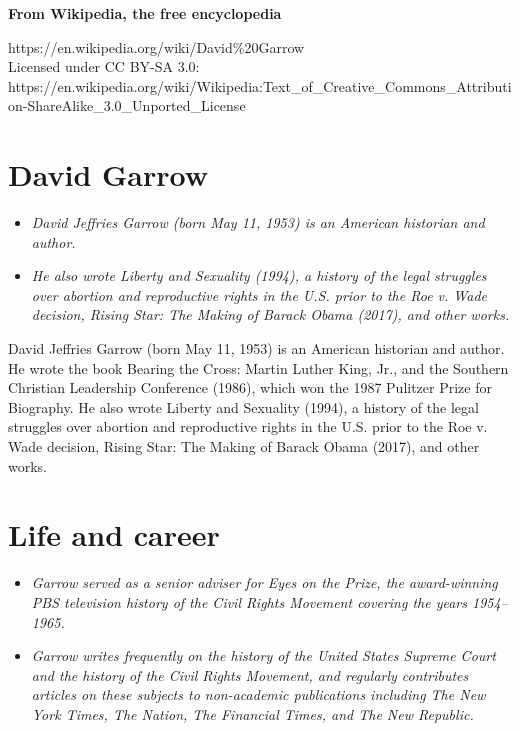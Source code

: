 \textbf{From Wikipedia, the free encyclopedia}

https://en.wikipedia.org/wiki/David\%20Garrow\\
Licensed under CC BY-SA 3.0:\\
https://en.wikipedia.org/wiki/Wikipedia:Text\_of\_Creative\_Commons\_Attribution-ShareAlike\_3.0\_Unported\_License

\section{David Garrow}\label{david-garrow}

\begin{itemize}
\item
  \emph{David Jeffries Garrow (born May 11, 1953) is an American
  historian and author.}
\item
  \emph{He also wrote Liberty and Sexuality (1994), a history of the
  legal struggles over abortion and reproductive rights in the U.S.
  prior to the Roe v. Wade decision, Rising Star: The Making of Barack
  Obama (2017), and other works.}
\end{itemize}

David Jeffries Garrow (born May 11, 1953) is an American historian and
author. He wrote the book Bearing the Cross: Martin Luther King, Jr.,
and the Southern Christian Leadership Conference (1986), which won the
1987 Pulitzer Prize for Biography. He also wrote Liberty and Sexuality
(1994), a history of the legal struggles over abortion and reproductive
rights in the U.S. prior to the Roe v. Wade decision, Rising Star: The
Making of Barack Obama (2017), and other works.

\section{Life and career}\label{life-and-career}

\begin{itemize}
\item
  \emph{Garrow served as a senior adviser for Eyes on the Prize, the
  award-winning PBS television history of the Civil Rights Movement
  covering the years 1954--1965.}
\item
  \emph{Garrow writes frequently on the history of the United States
  Supreme Court and the history of the Civil Rights Movement, and
  regularly contributes articles on these subjects to non-academic
  publications including The New York Times, The Nation, The Financial
  Times, and The New Republic.}
\end{itemize}

